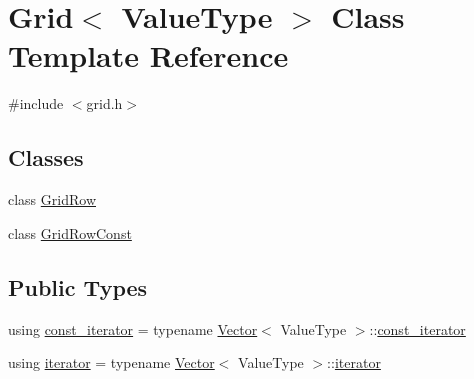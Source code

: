 \hypertarget{classGrid}{}\section{Grid$<$ Value\+Type $>$ Class Template Reference}
\label{classGrid}


{\ttfamily \#include $<$grid.\+h$>$}

\subsection*{Classes}
\begin{DoxyCompactItemize}
\item 
class \mbox{\hyperlink{classGrid_1_1GridRow}{Grid\+Row}}
\item 
class \mbox{\hyperlink{classGrid_1_1GridRowConst}{Grid\+Row\+Const}}
\end{DoxyCompactItemize}
\subsection*{Public Types}
\begin{DoxyCompactItemize}
\item 
using \mbox{\hyperlink{classGrid_a85b414fe7dab929481b0e9d4cbc8eaed}{const\+\_\+iterator}} = typename \mbox{\hyperlink{classVector}{Vector}}$<$ Value\+Type $>$\+::\mbox{\hyperlink{classGrid_a85b414fe7dab929481b0e9d4cbc8eaed}{const\+\_\+iterator}}
\item 
using \mbox{\hyperlink{classGrid_afc815b8f7acde11a959911c7f7222116}{iterator}} = typename \mbox{\hyperlink{classVector}{Vector}}$<$ Value\+Type $>$\+::\mbox{\hyperlink{classGrid_afc815b8f7acde11a959911c7f7222116}{iterator}}
\end{DoxyCompactItemize}

